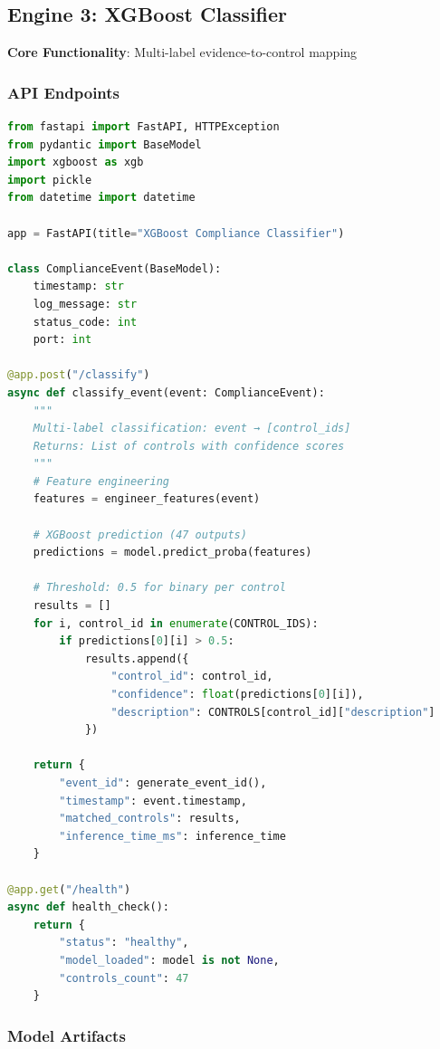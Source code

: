 \documentclass[11pt,conference]{IEEEtran}
\begin{document}
\subsection{Engine 3: XGBoost Classifier}

\textbf{Core Functionality}: Multi-label evidence-to-control mapping

\subsubsection{API Endpoints}

\begin{lstlisting}[language=Python]
from fastapi import FastAPI, HTTPException
from pydantic import BaseModel
import xgboost as xgb
import pickle
from datetime import datetime

app = FastAPI(title="XGBoost Compliance Classifier")

class ComplianceEvent(BaseModel):
    timestamp: str
    log_message: str
    status_code: int
    port: int

@app.post("/classify")
async def classify_event(event: ComplianceEvent):
    """
    Multi-label classification: event → [control_ids]
    Returns: List of controls with confidence scores
    """
    # Feature engineering
    features = engineer_features(event)

    # XGBoost prediction (47 outputs)
    predictions = model.predict_proba(features)

    # Threshold: 0.5 for binary per control
    results = []
    for i, control_id in enumerate(CONTROL_IDS):
        if predictions[0][i] > 0.5:
            results.append({
                "control_id": control_id,
                "confidence": float(predictions[0][i]),
                "description": CONTROLS[control_id]["description"]
            })

    return {
        "event_id": generate_event_id(),
        "timestamp": event.timestamp,
        "matched_controls": results,
        "inference_time_ms": inference_time
    }

@app.get("/health")
async def health_check():
    return {
        "status": "healthy",
        "model_loaded": model is not None,
        "controls_count": 47
    }
\end{lstlisting}

\subsubsection{Model Artifacts}
\end{document}
